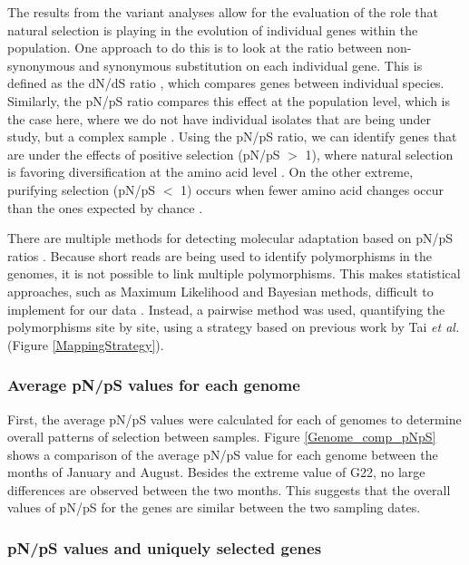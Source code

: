 The results from the variant analyses allow for the evaluation of the role that natural selection is playing in the evolution of individual genes within the population. One approach to do this is to look at the ratio between non-synonymous and synonymous substitution on each individual gene. This is defined as the dN/dS ratio \cite{McDonald:1991hj}, which compares genes between individual species. Similarly, the pN/pS ratio compares this effect at the population level, which is the case here, where we do not have individual isolates that are being under study, but a complex sample \cite{Egea:2008jo,Schloissnig:2012hx}. Using the pN/pS ratio, we can identify genes that are under the effects of positive selection (pN/pS $>$ 1), where natural selection is favoring diversification at the amino acid level \cite{Hurst:2002ht}. On the other extreme, purifying selection (pN/pS $<$ 1) occurs when fewer amino acid changes occur than the ones expected by chance \cite{Hurst:2002ht}.

There are multiple methods for detecting molecular adaptation based on pN/pS ratios \cite{Yang:2000hh}. Because short reads are being used to identify polymorphisms in the genomes, it is not possible to link multiple polymorphisms. This makes statistical approaches, such as Maximum Likelihood and Bayesian methods, difficult to implement for our data \cite{Yang:2000hh}. Instead, a pairwise method was used, quantifying the polymorphisms site by site, using a strategy based on previous work by Tai \textit{et al.} \cite{Tai:2011jo} (Figure \ref{MappingStrategy}). 

\subsubsection{Average pN/pS values for each genome}

First, the average pN/pS values were calculated for each of genomes to determine overall patterns of selection between samples. Figure \ref{Genome_comp_pNpS} shows a comparison of the average pN/pS value for each genome between the months of January and August. Besides the extreme value of G22, no large differences are observed between the two months. This suggests that the overall values of pN/pS for the genes are similar between the two sampling dates.


\subsubsection{pN/pS values and uniquely selected genes}

